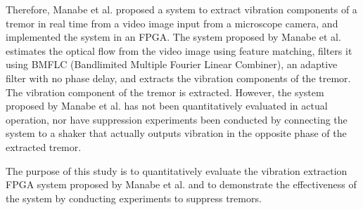 
Therefore, Manabe et al. proposed a system to extract vibration components of a tremor in real time from a video image input from a microscope camera, and implemented the system in an FPGA.\cite{bib:Image-Based_Vibration_Extraction}
The system proposed by Manabe et al. estimates the optical flow from the video image using feature matching,
filters it using BMFLC (Bandlimited Multiple Fourier Linear Combiner)\cite{bib:BMFLC},
an adaptive filter with no phase delay, and extracts the vibration components of the tremor.
The vibration component of the tremor is extracted. However, the system proposed by Manabe et al. has not been quantitatively evaluated in actual operation,
nor have suppression experiments been conducted by connecting the system to a shaker that actually outputs vibration in the opposite phase of the extracted tremor.

 


The purpose of this study is to quantitatively evaluate the vibration extraction FPGA system proposed by Manabe et al.
and to demonstrate the effectiveness of the system by conducting experiments to suppress tremors.
 



